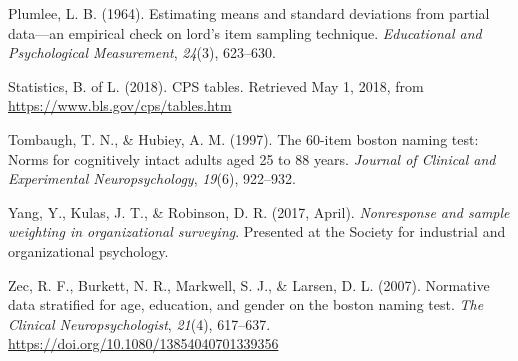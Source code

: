 \documentclass[
  ,man]{apa6}
\newlength{\cslhangindent}
\newlength{\cslentryspacingunit} %
\newenvironment{CSLReferences}[2] %
 {%
  \setlength{\parindent}{0pt}
  \ifodd #1
  \let\oldpar\par
  \def\par{\hangindent=\cslhangindent\oldpar}
  \fi
  \setlength{\parskip}{#2\cslentryspacingunit}
 }%
 {}
\begin{document}
\begin{CSLReferences}{1}{0}
\leavevmode{}%
Plumlee, L. B. (1964). Estimating means and standard deviations from partial data---an empirical check on lord's item sampling technique. \emph{Educational and Psychological Measurement}, \emph{24}(3), 623--630.

\leavevmode{}%
Statistics, B. of L. (2018). {CPS} tables. Retrieved May 1, 2018, from \url{https://www.bls.gov/cps/tables.htm}

\leavevmode{}%
Tombaugh, T. N., \& Hubiey, A. M. (1997). The 60-item boston naming test: Norms for cognitively intact adults aged 25 to 88 years. \emph{Journal of Clinical and Experimental Neuropsychology}, \emph{19}(6), 922--932.

\leavevmode{}%
Yang, Y., Kulas, J. T., \& Robinson, D. R. (2017, April). \emph{Nonresponse and sample weighting in organizational surveying}. Presented at the Society for industrial and organizational psychology.

\leavevmode{}%
Zec, R. F., Burkett, N. R., Markwell, S. J., \& Larsen, D. L. (2007). Normative data stratified for age, education, and gender on the boston naming test. \emph{The Clinical Neuropsychologist}, \emph{21}(4), 617--637. \url{https://doi.org/10.1080/13854040701339356}

\end{CSLReferences}

\endgroup
\end{document}
